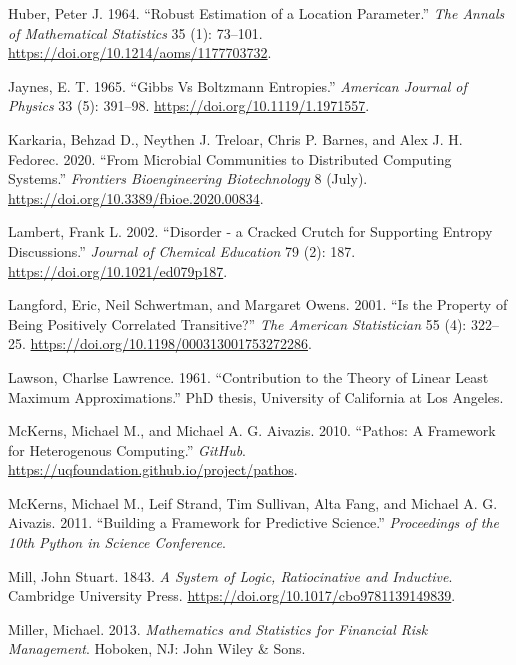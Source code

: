 \documentclass[
  letterpaper,
  DIV=11,
  numbers=noendperiod]{scrreprt}
\newlength{\cslhangindent}
\newenvironment{CSLReferences}[2] %
 {\begin{list}{}{%
  \setlength{\itemindent}{0pt}
  \setlength{\leftmargin}{0pt}
  \setlength{\parsep}{0pt}
  \ifodd #1
   \setlength{\leftmargin}{\cslhangindent}
   \setlength{\itemindent}{-1\cslhangindent}
  \fi
  \setlength{\itemsep}{#2\baselineskip}}}
 {\end{list}}
\begin{document}
\begin{CSLReferences}{1}{0}
Huber, Peter J. 1964. {``Robust Estimation of a Location Parameter.''}
\emph{The Annals of Mathematical Statistics} 35 (1): 73--101.
\url{https://doi.org/10.1214/aoms/1177703732}.

Jaynes, E. T. 1965. {``Gibbs Vs Boltzmann Entropies.''} \emph{American
Journal of Physics} 33 (5): 391--98.
\url{https://doi.org/10.1119/1.1971557}.

Karkaria, Behzad D., Neythen J. Treloar, Chris P. Barnes, and Alex J. H.
Fedorec. 2020. {``From Microbial Communities to Distributed Computing
Systems.''} \emph{Frontiers Bioengineering Biotechnology} 8 (July).
\url{https://doi.org/10.3389/fbioe.2020.00834}.

Lambert, Frank L. 2002. {``Disorder - a Cracked Crutch for Supporting
Entropy Discussions.''} \emph{Journal of Chemical Education} 79 (2):
187. \url{https://doi.org/10.1021/ed079p187}.

Langford, Eric, Neil Schwertman, and Margaret Owens. 2001. {``Is the
Property of Being Positively Correlated Transitive?''} \emph{The
American Statistician} 55 (4): 322--25.
\url{https://doi.org/10.1198/000313001753272286}.

Lawson, Charlse Lawrence. 1961. {``Contribution to the Theory of Linear
Least Maximum Approximations.''} PhD thesis, University of California at
Los Angeles.

McKerns, Michael M., and Michael A. G. Aivazis. 2010. {``Pathos: A
Framework for Heterogenous Computing.''} \emph{GitHub}.
\url{https://uqfoundation.github.io/project/pathos}.

McKerns, Michael M., Leif Strand, Tim Sullivan, Alta Fang, and Michael
A. G. Aivazis. 2011. {``Building a Framework for Predictive Science.''}
\emph{Proceedings of the 10th Python in Science Conference}.

Mill, John Stuart. 1843. \emph{A System of Logic, Ratiocinative and
Inductive}. Cambridge University Press.
\url{https://doi.org/10.1017/cbo9781139149839}.

Miller, Michael. 2013. \emph{Mathematics and Statistics for Financial
Risk Management}. Hoboken, NJ: John Wiley \& Sons.


\end{CSLReferences}
\end{document}
